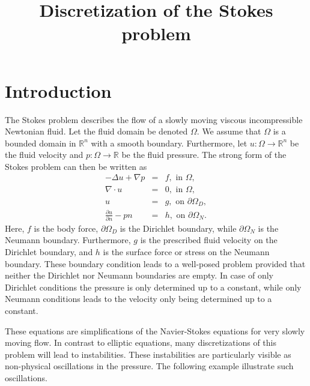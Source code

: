 \documentclass[a4paper,11pt]{amsart}
\title{Discretization of the Stokes problem}
\begin{document}
\maketitle

\section{Introduction}
The Stokes problem describes the flow of a slowly moving viscous incompressible Newtonian
fluid.  Let the fluid domain be denoted $\Omega$. We assume that $\Omega$ is a bounded domain in $\mathbb{R}^n$ with a smooth boundary. Furthermore, let $u : \Omega \rightarrow \mathbb{R}^n$ be
the fluid velocity and $p:\Omega \rightarrow \mathbb{R}$ be the fluid pressure.
The strong form of the Stokes problem can then be written as
\begin{eqnarray}
-\Delta u + \nabla p &=& f, \mbox{ in } \Omega,   \\
\nabla \cdot u &=& 0, \mbox{ in } \Omega, \\
u &=& g, \mbox{ on } \partial \Omega_D, \\
\frac{\partial u}{\partial n} - p n  &=& h, \mbox{ on } \partial \Omega_N.
\end{eqnarray}
Here, $f$ is the body force, $\partial \Omega_D$ is the Dirichlet
boundary, while $\partial \Omega_N$ is the Neumann
boundary. Furthermore, $g$ is the prescribed fluid velocity on the
Dirichlet boundary, and $h$ is the surface force or stress on the
Neumann boundary. These boundary condition leads to a well-posed
problem provided that neither the Dirichlet nor Neumann boundaries are
empty.  In case of only Dirichlet conditions the pressure is only
determined up to a constant, while only Neumann conditions leads to
the velocity only being determined up to a constant.

These equations are simplifications of the Navier-Stokes equations for
very slowly moving flow.  In contrast to elliptic equations, many
discretizations of this problem will lead to instabilities.  These
instabilities are particularly visible as non-physical oscillations in
the pressure. The following example illustrate such oscillations.
\end{document}

